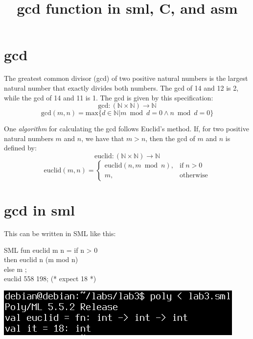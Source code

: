 \documentclass{article}
\title{gcd function in sml, C, and asm}
\begin{document}
 
\maketitle
\tableofcontents
\clearpage\section{gcd}
The greatest common divisor (gcd) of two positive natural numbers is the largest natural 
number that exactly divides both numbers. 
The gcd of 14 and 12 is 2, while the gcd of 14 and 11 is 1.
The gcd is given by this specification:
\[ \text{gcd} : (\mathbb{N} \times \mathbb{N}) \rightarrow \mathbb{N} \]
\[ \text{gcd}(m,n) = \text{max}\{d \in \mathbb{N} \vert m \bmod d = 0 \land n \bmod d = 0\} \]

One {\it algorithm} for calculating the gcd follows Euclid's method. If, for two positive natural
numbers $m$ and $n$, we have that $m>n$, then the gcd of $m$ and $n$ is defined by:
\[ \text{euclid} : (\mathbb{N} \times \mathbb{N}) \rightarrow \mathbb{N} \]
\[ \text{euclid}(m,n) = 
     \left\{
        \begin{array}{lr}
             \text{euclid}(n,m \bmod n), & \text{if} \; n > 0 \\
             m, & \text{otherwise}
        \end{array}
      \right.
 \]
\clearpage\section{gcd in sml}
This can be written in SML like this:
\begin{GFT}{SML}
\+fun euclid m n = if n > 0\\
\+                    then euclid n (m mod n)\\
\+                    else m ;\\
\+euclid 558 198;  (* expect 18 *)\\
\end{GFT}
\includegraphics[scale=0.5]{fig1.png}\\
\end{document}

